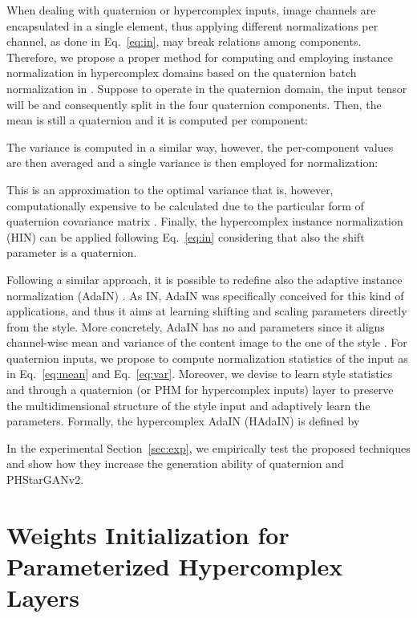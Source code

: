 \documentclass[conference]{IEEEtran}
\begin{document}
When dealing with quaternion or hypercomplex inputs, image channels are encapsulated in a single element, thus applying different normalizations per channel, as done in Eq.~\ref{eq:in}, may break relations among components. Therefore, we propose a proper method for computing and employing instance normalization in hypercomplex domains based on the quaternion batch normalization in \cite{VecchiTIT2020}. Suppose to operate in the quaternion domain, the input tensor will be  and consequently split in the four quaternion components. Then, the mean  is still a quaternion and it is computed per component:

The variance is computed in a similar way, however, the per-component values are then averaged and a single variance is then employed for normalization:

This is an approximation to the optimal variance that is, however, computationally expensive to be calculated due to the particular form of quaternion covariance matrix \cite{GrassucciQGAN2021, MandicSPL2011, TookSIGPRO2011, hoffmann2020algebranets}. Finally, the hypercomplex instance normalization (HIN) can be applied following Eq.~\ref{eq:in} considering that also the shift parameter  is a quaternion.






Following a similar approach, it is possible to redefine also the adaptive instance normalization (AdaIN) \cite{huang2017adain}. As IN, AdaIN was specifically conceived for this kind of applications, and thus it aims at learning shifting and scaling parameters directly from the style. More concretely, AdaIN has no  and  parameters since it aligns channel-wise mean and variance of the content image  to the one of the style . For quaternion inputs, we propose to compute normalization statistics of the input  as in Eq.~\ref{eq:mean} and Eq.~\ref{eq:var}. Moreover, we devise to learn style statistics  and  through a quaternion (or PHM for hypercomplex inputs) layer to preserve the multidimensional structure of the style input and adaptively learn the parameters. Formally, the hypercomplex AdaIN (HAdaIN) is defined by



In the experimental Section~\ref{sec:exp}, we empirically test the proposed techniques and show how they increase the generation ability of quaternion and PHStarGANv2.

\section{Weights Initialization for Parameterized Hypercomplex Layers}
\label{sec:init}
\end{document}
